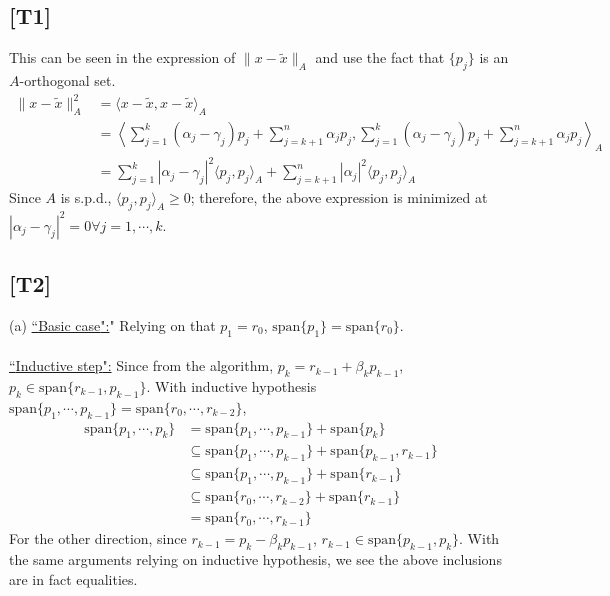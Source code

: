 \documentclass[12pt,a4paper]{article}
\newcommand{\claim}[1]{\underline{``{#1}":}}
\newcommand{\bga}{\begin{align*}}
\renewcommand{\l}{\left}\renewcommand{\r}{\right}
\newcommand{\SUM}[2]{\sum\limits_{#1}^{#2}}
\begin{document}
\subsection*{[T1]} 
This can be seen in the expression of $\|x - \tilde x\|_A$ and use the fact that $\{p_j\}$ is an $A$-orthogonal set.
\bga
\|x - \tilde x\|_A^2
& = \langle x - \tilde x, x -  \tilde x \rangle_A \\
& = \l\langle \SUM{j=1}k (\alpha_j-\gamma_j) p_j + \SUM{j=k+1}n \alpha_j p_j, \SUM{j=1}k (\alpha_j-\gamma_j)p_j + \SUM{j=k+1}n \alpha_j p_j\r\rangle_A \\
& = \SUM{j=1}k |\alpha_j - \gamma_j|^2 \langle p_j, p_j \rangle_A + \SUM{j=k+1}n |\alpha_j|^2 \langle p_j, p_j\rangle_A
\end{align*}
Since $A$ is s.p.d., $\langle p_j, p_j \rangle_A \geq 0$; therefore, the above expression is minimized at $|\alpha_j  - \gamma_j|^2 = 0 \forall j=1, \cdots, k$. 


\subsection*{[T2]}
(a) \claim{Basic case}" Relying on that $p_1 = r_0$, $\mbox{span}\{p_1\} = \mbox{span}\{r_0\}$. \\
\\
\claim{Inductive step} Since from the algorithm, $p_k = r_{k-1} + \beta_k p_{k-1}$, $p_k \in \mbox{span}\{r_{k-1}, p_{k-1}\}$. With inductive hypothesis $\mbox{span}\{p_1, \cdots, p_{k-1}\} = \mbox{span}\{r_0, \cdots, r_{k-2}\}$, 
\bga
\mbox{span}\{p_1, \cdots, p_k\} 
& = \mbox{span}\{p_1, \cdots, p_{k-1}\} + \mbox{span}\{p_{k}\}  \\
& \subseteq \mbox{span}\{p_1, \cdots, p_{k-1}\} + \mbox{span}\{p_{k-1}, r_{k-1}\}  \\
& \subseteq \mbox{span}\{p_1, \cdots, p_{k-1}\} + \mbox{span}\{r_{k-1}\}  \\
& \subseteq \mbox{span}\{r_0, \cdots, r_{k-2}\} + \mbox{span}\{r_{k-1}\}\\
&  = \mbox{span}\{r_0, \cdots, r_{k-1}\}
\end{align*}
For the other direction, since $r_{k-1} = p_{k}-\beta_k p_{k-1}$, $r_{k-1} \in \mbox{span}\{p_{k-1}, p_k\}$. With the same arguments relying on inductive hypothesis, we see the above inclusions are in fact equalities. 
\end{document}
